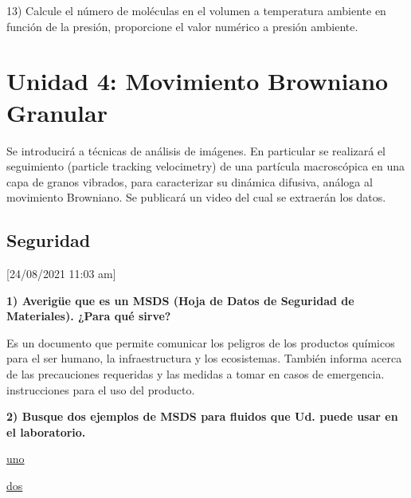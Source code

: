 \documentclass[letterpaper,11pt]{article}
\begin{document}
13) Calcule el número de moléculas en el volumen a temperatura ambiente en función
de la presión, proporcione el valor numérico a presión ambiente.



\newpage

\section{Unidad 4: Movimiento Browniano Granular}

Se introducirá a técnicas de análisis de
imágenes. En particular se realizará el seguimiento (particle tracking velocimetry)
de una partícula macroscópica en una capa de granos vibrados, para caracterizar su dinámica difusiva, análoga al movimiento Browniano. Se publicará un video del cual se extraerán los datos.

\subsection{Seguridad}
[24/08/2021  11:03 am]

\textbf{1) Averigüe que es un MSDS (Hoja de Datos de Seguridad de Materiales). ¿Para qué sirve?}

Es un documento que permite comunicar los peligros de los productos químicos para el ser humano, la infraestructura y los ecosistemas. También informa acerca de las precauciones requeridas y las medidas a tomar en casos de emergencia.
instrucciones para el uso del producto. 

\textbf{2) Busque dos ejemplos de MSDS para fluidos que Ud. puede usar en el laboratorio.}

\href{https://quimicauniversal.cl/www/wp-content/uploads/2020/08/AGUARRAS-18-min.pdf}{uno}

\href{https://www.carlroth.com/medias/SDB-4309-ES-ES.pdf?context=bWFzdGVyfHNlY3VyaXR5RGF0YXNoZWV0c3wxNzYxNDR8YXBwbGljYXRpb24vcGRmfHNlY3VyaXR5RGF0YXNoZWV0cy9oNDEvaDMyLzg5NTA4ODUyNTMxNTAucGRmfDNlNjhiMGU1ODA0YTBmZTQ2MTdhYmQxNmU1OTAxY2UzNmNiNGQ0YTdiOGVjNWRjOGI2N2ZkNzE0MTk1ODRkZjQ}{dos}
\end{document}
